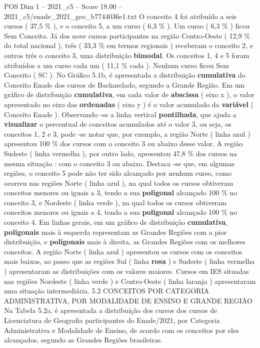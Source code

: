 \begin{textsample}{POS Dim 1 – 2021\_c5 – Score 18.00 – 2021\_c5/enade\_2021\_geo\_b7744036e1.txt}
O conceito 4 foi atribuído a seis cursos ( 37,5 \% ), e o conceito 5, a um curso ( 6,3 \% ).
Um curso ( 6,3 \% ) ficou Sem Conceito.
Já dos nove cursos participantes na região Centro-Oeste ( 12,9 \% do total nacional ), três ( 33,3 \% em termos regionais ) receberam o conceito 2, e outros três o conceito 3, uma distribuição \textbf{bimodal}.
Os conceitos 1, 4 e 5 foram atribuídos a um curso cada um ( 11,1 \% cada ).
Nenhum curso ficou Sem Conceito ( SC ).
No Gráfico 5.1b, é apresentada a distribuição \textbf{cumulativa} do Conceito Enade dos cursos de Bacharelado, segundo a Grande Região.
Em um gráfico de distribuição \textbf{cumulativa}, em cada valor de \textbf{abscissa} ( eixo x ), o valor apresentado no eixo das \textbf{ordenadas} ( eixo y ) é o valor acumulado da \textbf{variável} ( Conceito Enade ).
Observando -se a linha vertical \textbf{pontilhada}, que ajuda a \textbf{visualizar} o percentual de conceitos acumulados até o valor 3, ou seja, os conceitos 1, 2 e 3, pode -se notar que, por exemplo, a região Norte ( linha azul ) apresentou 100 \% dos cursos com o conceito 3 ou abaixo desse valor.
A região Sudeste ( linha vermelha ), por outro lado, apresentou 47,8 \% dos cursos na mesma situação : com o conceito 3 ou abaixo.
Destaca -se que, em algumas regiões, o conceito 5 pode não ter sido alcançado por nenhum curso, como ocorreu nas regiões Norte ( linha azul ), na qual todos os cursos obtiveram conceitos menores ou iguais a 3, tendo a sua \textbf{poligonal} alcançado 100 \% no conceito 3, e Nordeste ( linha verde ), na qual todos os cursos obtiveram conceitos menores ou iguais a 4, tendo a sua \textbf{poligonal} alcançado 100 \% no conceito 4.
Em linhas gerais, em um gráfico de distribuição \textbf{cumulativa}, \textbf{poligonais} mais à esquerda representam as Grandes Regiões com a pior distribuição, e \textbf{poligonais} mais à direita, as Grandes Regiões com os melhores conceitos.
A região Norte ( linha azul ) apresentou os cursos com os conceitos mais baixos, ao passo que as regiões Sul ( linha \textbf{rosa} ) e Sudeste ( linha vermelha ) apresentaram as distribuições com os valores maiores.
Cursos em IES situadas nas regiões Nordeste ( linha verde ) e Centro-Oeste ( linha laranja ) apresentaram uma situação intermediária. 5.2 CONCEITOS POR CATEGORIA ADMINISTRATIVA, POR MODALIDADE DE ENSINO E GRANDE REGIÃO Na Tabela 5.2a, é apresentada a distribuição dos cursos dos cursos de Licenciatura de Geografia participantes do Enade/2021, por Categoria Administrativa e Modalidade de Ensino, de acordo com os conceitos por eles alcançados, segundo as Grandes Regiões brasileiras.

\end{textsample}
